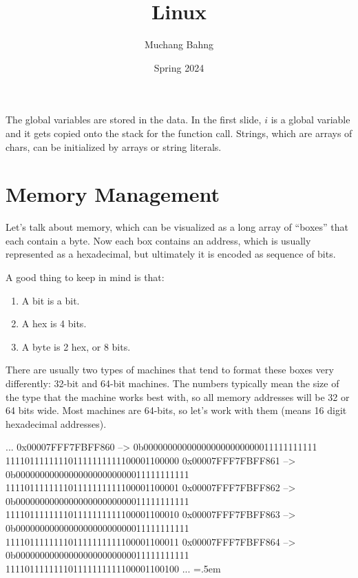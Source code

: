 \documentclass{article}
\theoremstyle{definition}
\newenvironment{cverbatim}
   {\SaveVerbatim{cverb}}
   {\endSaveVerbatim
    \flushleft\fboxrule=0pt\fboxsep=.5em
    \colorbox{cverbbg}{%
      \makebox[\dimexpr\linewidth-2\fboxsep][l]{\BUseVerbatim{cverb}}%
    }
    \endflushleft
  }
\begin{document}
\pagestyle{fancy}

\cfoot{\thepage / \pageref{LastPage}}


\title{Linux}
\author{Muchang Bahng}
\date{Spring 2024}

\maketitle

\tableofcontents

\pagebreak

The global variables are stored in the data. In the first slide, $i$ is a global variable and it gets copied onto the stack for the function call. 
Strings, which are arrays of chars, can be initialized by arrays or string literals. 

\section{Memory Management} 

  Let's talk about memory, which can be visualized as a long array of ``boxes'' that each contain a byte. Now each box contains an address, which is usually represented as a hexadecimal, but ultimately it is encoded as sequence of bits. 

  A good thing to keep in mind is that: 
  \begin{enumerate} 
    \item A bit is a bit. 
    \item A hex is 4 bits. 
    \item A byte is 2 hex, or 8 bits. 
  \end{enumerate}

  There are usually two types of machines that tend to format these boxes very differently: 32-bit and 64-bit machines. The numbers typically mean the size of the type that the machine works best with, so all memory addresses will be 32 or 64 bits wide. Most machines are 64-bits, so let's work with them (means 16 digit hexadecimal addresses). 

  \begin{cverbatim} 
    ...
    0x00007FFF7FBFF860 --> 0b000000000000000000000000011111111111
                           111101111111101111111111100001100000
    0x00007FFF7FBFF861 --> 0b000000000000000000000000011111111111
                           111101111111101111111111100001100001
    0x00007FFF7FBFF862 --> 0b000000000000000000000000011111111111
                           111101111111101111111111100001100010
    0x00007FFF7FBFF863 --> 0b000000000000000000000000011111111111
                           111101111111101111111111100001100011
    0x00007FFF7FBFF864 --> 0b000000000000000000000000011111111111
                           111101111111101111111111100001100100
    ...
  \end{cverbatim}
\end{document}
